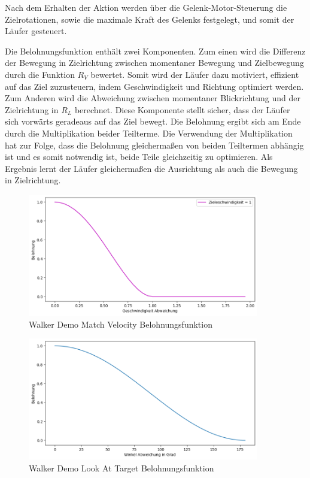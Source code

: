Nach dem Erhalten der Aktion werden über die Gelenk-Motor-Steuerung die Zielrotationen, sowie die maximale Kraft des Gelenks festgelegt, und somit der Läufer gesteuert.

Die Belohnungsfunktion enthält zwei Komponenten. Zum einen wird die Differenz der Bewegung in Zielrichtung zwischen momentaner Bewegung und Zielbewegung durch die Funktion $R_V$ bewertet. Somit wird der Läufer dazu motiviert, effizient auf das Ziel zuzusteuern, indem Geschwindigkeit und Richtung optimiert werden. Zum Anderen wird die Abweichung zwischen momentaner Blickrichtung und der Zielrichtung in $R_L$ berechnet. Diese Komponente stellt sicher, dass der Läufer sich vorwärts geradeaus auf das Ziel bewegt. Die Belohnung ergibt sich am Ende durch die Multiplikation beider Teilterme. Die Verwendung der Multiplikation hat zur Folge, dass die Belohnung gleichermaßen von beiden Teiltermen abhängig ist und es somit notwendig ist, beide Teile gleichzeitig zu optimieren. Als Ergebnis lernt der Läufer gleichermaßen die Ausrichtung als auch die Bewegung in Zielrichtung.

\begin{figure}[H]
  \centering  
  \includegraphics[width=0.9\textwidth]{img/plot_demo_vel_1}
  \caption{Walker Demo Match Velocity Belohnungsfunktion}
  \label{fig:plot_demo_vel_1}
\end{figure}

\begin{figure}[H]
  \centering  
  \includegraphics[width=0.9\textwidth]{img/plot_demo_look}
  \caption{Walker Demo Look At Target Belohnungsfunktion}
  \label{fig:plot_demo_look}
\end{figure}

